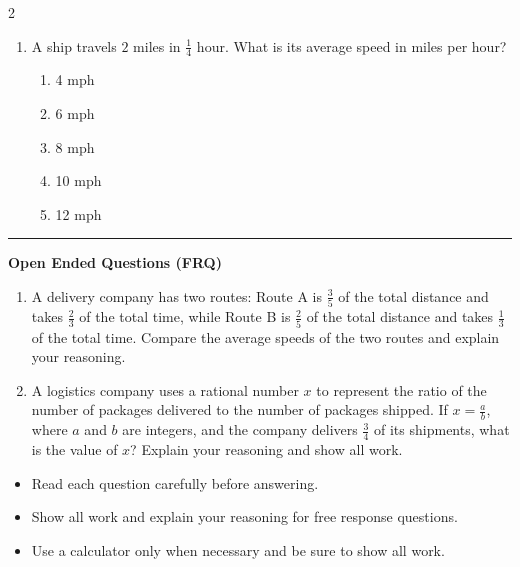 \documentclass[10pt]{article}
\begin{document}
\begin{multicols}{2}
\begin{enumerate}[label=\textbf{Q\arabic*.}, leftmargin=*, itemsep=6pt, parsep=0pt]
  \item \small A ship travels $2$ miles in $\frac{1}{4}$ hour. What is its average speed in miles per hour?
  \begin{enumerate}[label=(\Alph*), leftmargin=0.6cm, nosep, itemsep=2pt]
    \item 4 mph
    \item 6 mph
    \item 8 mph
    \item 10 mph
    \item 12 mph
  \end{enumerate}

\end{enumerate}
\end{multicols}

\vspace{-0.2cm}
\hrule
\vspace{0.2cm}
\textbf{\small Open Ended Questions (FRQ)}
\begin{enumerate}[label=\textbf{Q\arabic*.}, start=9, itemsep=5pt, topsep=0pt]

  \item \small A delivery company has two routes: Route A is $\frac{3}{5}$ of the total distance and takes $\frac{2}{3}$ of the total time, while Route B is $\frac{2}{5}$ of the total distance and takes $\frac{1}{3}$ of the total time. Compare the average speeds of the two routes and explain your reasoning. \vspace{2cm}

  \item \small A logistics company uses a rational number $x$ to represent the ratio of the number of packages delivered to the number of packages shipped. If $x = \frac{a}{b}$, where $a$ and $b$ are integers, and the company delivers $\frac{3}{4}$ of its shipments, what is the value of $x$? Explain your reasoning and show all work. \vspace{2cm}

\end{enumerate}

\vfill

\begin{tcolorbox}[colback=blue!5, colframe=mainblue!50, title=\small \textbf{Chef's Tips}, fonttitle=\bfseries, bottom=1mm]
\begin{itemize}[noitemsep, topsep=2pt, leftmargin=0.5cm]
  \item \scriptsize Read each question carefully before answering.\item \scriptsize Show all work and explain your reasoning for free response questions.\item \scriptsize Use a calculator only when necessary and be sure to show all work.
\end{itemize}
\end{tcolorbox}
\end{document}
